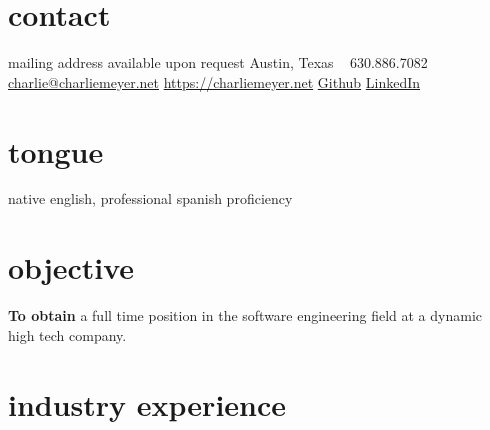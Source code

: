 \documentclass{friggeri-cv} %
\begin{document}


\begin{aside} %
\section{contact}
mailing address available upon request
Austin, Texas
~
630.886.7082
~
\href{mailto:charlie@charliemeyer.net}{charlie@charliemeyer.net}
\href{https://charliemeyer.net}{https://charliemeyer.net}
\href{https://www.github.com/cemeyer2}{Github}
\href{www.linkedin.com/in/cemeyer2}{LinkedIn}
~
\section{tongue}
native english,
professional spanish proficiency
\end{aside}

\section{objective}

\textbf{To obtain} a full time position in the software engineering field at a dynamic high tech company.

\section{industry experience}
\end{document}
